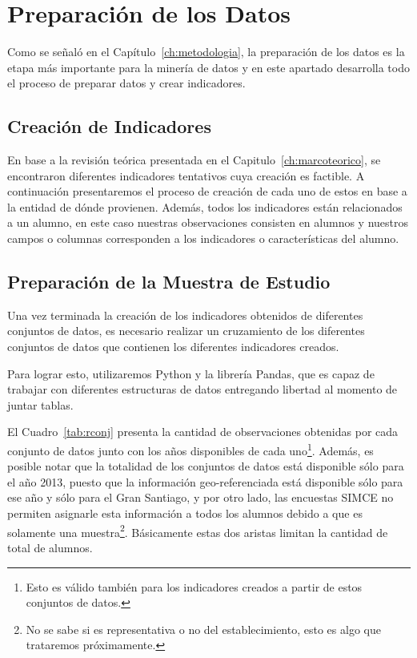 \section{Preparación de los Datos}
Como se señaló en el Capítulo~\ref{ch:metodologia}, la preparación de los datos es la etapa más importante para la minería de datos y en este apartado desarrolla todo el proceso de preparar datos y crear indicadores. 

\subsection{Creación de Indicadores}
En base a la revisión teórica presentada en el Capitulo~\ref{ch:marcoteorico}, se encontraron diferentes indicadores tentativos cuya creación es factible.
A continuación presentaremos el proceso de creación de cada uno de estos en base a la entidad de dónde provienen. Además, todos los indicadores están relacionados a un alumno, en este caso nuestras observaciones consisten en alumnos y nuestros campos o columnas corresponden a los indicadores o características del alumno.

\subsection{Preparación de la Muestra de Estudio}
Una vez terminada la creación de los indicadores obtenidos de diferentes conjuntos de datos, es necesario realizar un cruzamiento de los diferentes conjuntos de datos que contienen los diferentes indicadores creados.

Para lograr esto, utilizaremos Python y la librería Pandas, que es capaz de trabajar con diferentes estructuras de datos entregando libertad al momento de juntar tablas.

El Cuadro~\ref{tab:rconj} presenta la cantidad de observaciones obtenidas por cada conjunto de datos junto con los años disponibles de cada uno\footnote{Esto es válido también para los indicadores creados a partir de estos conjuntos de datos.}. Además, es posible notar que la totalidad de los conjuntos de datos está disponible sólo para el año 2013, puesto que la información geo-referenciada está disponible sólo para ese año y sólo para el Gran Santiago, y por otro lado, las encuestas SIMCE no permiten asignarle esta información a todos los alumnos debido a que es solamente una muestra\footnote{No se sabe si es representativa o no del establecimiento, esto es algo que trataremos próximamente.}. Básicamente estas dos aristas limitan la cantidad de total de alumnos.

